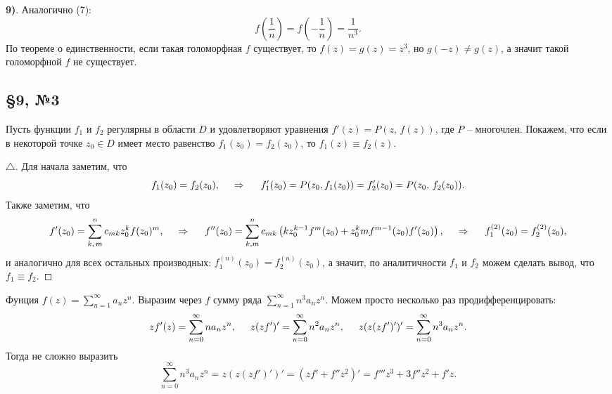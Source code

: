 \textbf{9)}. Аналогично (7):
\begin{equation*}
    f\left(\frac{1}{n}\right) = f\left(-\frac{1}{n}\right) = \frac{1}{n^3}.
\end{equation*}
По теореме о единственности, если такая голоморфная $f$ существует, то $f(z) = g(z) = z^3$, но $g(-z) \neq g(z)$, а значит такой голоморфной $f$ не существует. 




\subsection*{\S9, №3}


Пусть функции $f_1$  и $f_2$ регулярны в области $D$ и удовлетворяют уравнения $f'(z) = P(z,\, f(z))$, где $P$ -- многочлен. Покажем, что если в некоторой точке $z_0 \in D$ имеет место равенство $f_1 (z_0) = f_2 (z_0)$, то $f_1 (z) \equiv  f_2 (z)$.

\begin{proof}[$\triangle$]

Для начала заметим, что
\begin{equation*}
    f_1 (z_0) = f_2 (z_0),
    \hspace{0.5cm} \Rightarrow \hspace{0.5cm}
    f_1'(z_0) = P(z_0, f_1(z_0)) = f_2'(z_0) = P(z_0,\, f_2(z_0)).
\end{equation*}
Также заметим, что
\begin{equation*}
    f'(z_0) = \sum_{k,\, m}^{n} c_{mk} z_0^k f(z_0)^m,
    \hspace{0.5cm} \Rightarrow \hspace{0.5cm}
    f''(z_0) = \sum_{k, m}^{n} c_{mk} \left(
        k z_0^{k-1} f^m (z_0) + z_0^k m f^{m-1} (z_0) f'(z_0)
    \right),
    \hspace{0.5cm} \Rightarrow \hspace{0.5cm}
    f_1^{(2)}(z_0) = f_2^{(2)} (z_0),
\end{equation*}
и аналогично для всех остальных производных: $f_1^{(n)}(z_0) = f_2^{(n)} (z_0)$, а значит, по аналитичности $f_1$ и $f_2$ можем сделать вывод, что $f_1 \equiv f_2$. 


\end{proof}




Фунция $f(z) = \sum_{n=1}^{\infty}  a_n z^n$. Выразим через $f$ сумму ряда $\sum_{n=1}^{\infty} n^3 a_n z^n$. Можем просто несколько раз продифференцировать:
\begin{equation*}
    z f'(z) = \sum_{n = 0}^{\infty} n a_n z^n,
    \hspace{5 mm} 
    z (z f')' = \sum_{n=0}^{\infty} n^2 a_n z^n,
    \hspace{5 mm} 
    z (z (z f')')' = \sum_{n=0}^{\infty} n^3 a_n z^n.
\end{equation*}
Тогда не сложно выразить
\begin{equation*}
    \sum_{n=0}^{\infty} n^3 a_n z^n = z (z (z f')')' = (z f' + f'' z^2)' = 
    f''' z^3 + 3 f'' z^2 + f' z.
\end{equation*}




